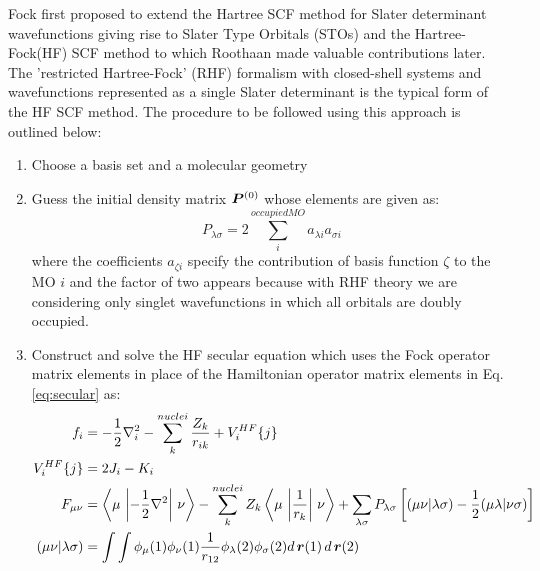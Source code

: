             Fock first proposed to extend the Hartree SCF method for Slater determinant wavefunctions giving rise to Slater Type Orbitals (STOs) and the Hartree-Fock(HF) SCF method to which Roothaan \cite{Roothaan1951} made valuable contributions later. The 'restricted Hartree-Fock' (RHF) formalism with closed-shell systems and wavefunctions represented as a single Slater determinant is the typical form of the HF SCF method. The procedure to be followed using this approach is outlined below:
            \begin{enumerate}
                \item Choose a basis set and a molecular geometry
                \item Guess the initial density matrix ${\boldsymbol {P}}^{(0)}$ whose elements are given as:
                    \begin{equation}\label{eq:density matrix elements}
                        P_{\lambda \sigma} = 2 \displaystyle\sum_i^{occupied MO} a_{\lambda i} a_{\sigma i}
                    \end{equation}
                    where the coefficients $a_{\zeta i}$ specify the contribution of basis function $\zeta$ to the MO $i$ and the factor of two appears because with RHF theory we are considering only singlet wavefunctions in which all orbitals are doubly occupied.
                \item Construct and solve the HF secular equation which uses the Fock operator matrix elements in place of the Hamiltonian operator matrix elements in Eq. \eqref{eq:secular} as:
                    \begin{equation}\label{eq:one electron Fock matrix elements}
                        \begin{aligned}
                            f_i &= -\frac{1}{2} \nabla^2_i - \displaystyle\sum_k^{nuclei} \frac{Z_k}{r_{ik}} + V_i^{HF} \{j\}\\
                            V_i^{HF} \{j\} &= 2 J_i - K_i\\
                            F_{\mu \nu} &= \left< \mu \,\left| -\frac{1}{2} \nabla^2 \right|\,\nu \right> - \displaystyle\sum_k^{nuclei} Z_k \left< \mu \,\left| \frac{1}{r_k} \right| \, \nu \right> + \displaystyle\sum_{\lambda \sigma} P_{\lambda \sigma} \left[ (\mu \nu | \lambda \sigma) - \frac{1}{2} (\mu \lambda | \nu \sigma) \right]\\
                            (\mu \nu | \lambda \sigma) &= \displaystyle\int \int \phi_\mu (1) \phi_\nu(1) \frac{1}{r_{12}}\phi_\lambda (2) \phi_\sigma (2) d\,\mbf{r}(1)\,d\,\mbf{r}(2)

\end{aligned}
\end{equation}
\end{enumerate}
